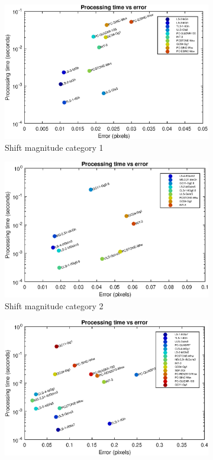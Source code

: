 \begin{figure}[ht!]
	\centering
	\begin{subfigure}{.5\linewidth}
		\includegraphics[width=1\textwidth]{img/avgTimesVsAccuracyShift1}
		\caption{\footnotesize{Shift magnitude category 1}}
	\end{subfigure}%
	\begin{subfigure}{.5\linewidth}
		\includegraphics[width=1\textwidth]{img/avgTimesVsAccuracyShift2}
		\caption{\footnotesize{Shift magnitude category 2}}
	\end{subfigure}
	\begin{subfigure}{.5\linewidth}
	\vspace{3mm}
		\includegraphics[width=1\textwidth]{img/avgTimesVsAccuracyShift3}

\end{subfigure}
\end{figure}
